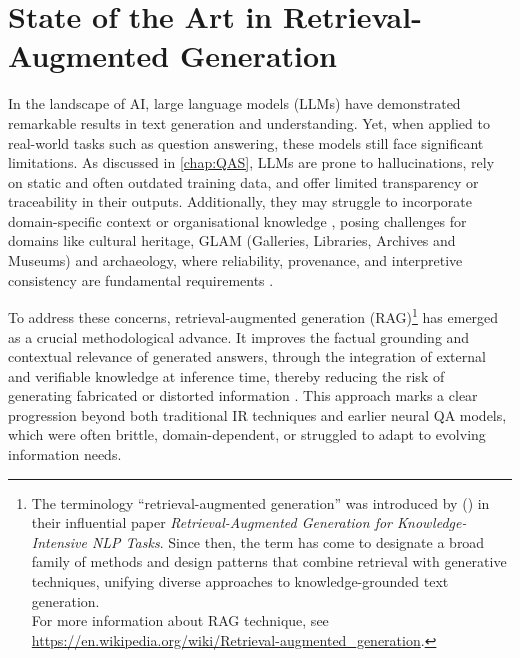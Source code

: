 \chapter{State of the Art in Retrieval-Augmented Generation}
\label{chap:sota}
\begin{spacing}{1.5}
\sloppy
In the landscape of AI, large language models (LLMs) have demonstrated remarkable results in text generation and understanding. Yet, when applied to real-world tasks such as question answering, these models still face significant limitations. As discussed in \autoref{chap:QAS}, LLMs are prone to hallucinations, rely on static and often outdated training data, and offer limited transparency or traceability in their outputs. Additionally, they may struggle to incorporate domain-specific context or organisational knowledge \citep{vaibhav_retrieval-augmented_2025}, posing challenges for domains like cultural heritage, GLAM (Galleries, Libraries, Archives and Museums) and archaeology, where reliability, provenance, and interpretive consistency are fundamental requirements \citep{di_marcantonio_intelligenza_2024}.

To address these concerns, retrieval-augmented generation (RAG)\footnote{The terminology ``retrieval-augmented generation'' was introduced by \citeauthor{lewis_retrieval-augmented_2020} (\citeyear{lewis_retrieval-augmented_2020}) in their influential paper \textit{Retrieval-Augmented Generation for Knowledge-Intensive NLP Tasks}. Since then, the term has come to designate a broad family of methods and design patterns that combine retrieval with generative techniques, unifying diverse approaches to knowledge-grounded text generation.\\ For more information about RAG technique, see \url{https://en.wikipedia.org/wiki/Retrieval-augmented_generation}.} has emerged as a crucial methodological advance. It improves the factual grounding and contextual relevance of generated answers, through the integration of external and verifiable knowledge at inference time, thereby reducing the risk of generating fabricated or distorted information \citep{martineau_what_2023}. This approach marks a clear progression beyond both traditional IR techniques and earlier neural QA models, which were often brittle, domain-dependent, or struggled to adapt to evolving information needs.


\end{spacing}
